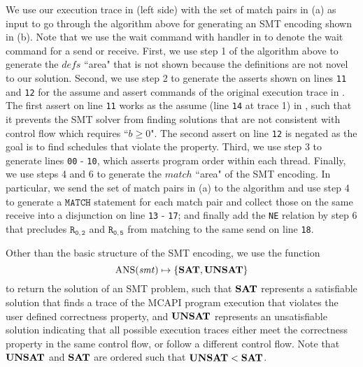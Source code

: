 We use our execution trace in  (left side) with the set of match pairs in (a) as input to go through the algorithm above for generating an SMT encoding shown in (b). Note that we use the wait command with handler in  to denote the wait command for a send or receive. First, we use step 1 of the algorithm above to generate the $\mathit{defs}$ ``area" that is not shown because the definitions are not novel to our solution. Second, we use step 2 to generate the asserts shown on lines \texttt{11} and \texttt{12} for the assume and assert commands of the original execution trace in . The first assert on line \texttt{11} works as the assume (line \texttt{14} at trace 1) in , such that it prevents the SMT solver from finding solutions that are not consistent with control flow which requires ``$b \ge 0$". The second assert on line \texttt{12} is negated as the goal is to find schedules that violate the property. Third, we use step 3 to generate lines \texttt{00} - \texttt{10}, which asserts program order within each thread. Finally, we use steps 4 and 6 to generate the $\mathit{match}$ ``area" of the SMT encoding. In particular, we send the set of match pairs in (a) to the algorithm and use step 4 to generate a $\mathtt{MATCH}$ statement for each match pair and collect those on the same receive into a disjunction on line \texttt{13} - \texttt{17}; and finally add the \texttt{NE} relation by step 6 that precludes $\mathtt{R_{0,2}}$ and $\mathtt{R_{0,5}}$ from matching to the same send on line \texttt{18}.

Other than the basic structure of the SMT encoding, we use the function
\[\mathrm{ANS}(\mathit{smt}) \mapsto \{\mathrm{\textbf{SAT}},\mathrm{\textbf{UNSAT}}\} \]
to return the solution of an SMT problem, such that $\mathrm{\textbf{SAT}}$ represents a satisfiable solution that finds a trace of the MCAPI program execution that violates the user defined correctness property, and $\mathrm{\textbf{UNSAT}}$ represents an unsatisfiable solution indicating that all possible execution traces either meet the correctness property in the same control flow, or follow a different control flow. Note that $\mathrm{\textbf{UNSAT}}$ and $\mathrm{\textbf{SAT}}$ are ordered such that $\mathrm{\textbf{UNSAT}} < \mathrm{\textbf{SAT}}$.

